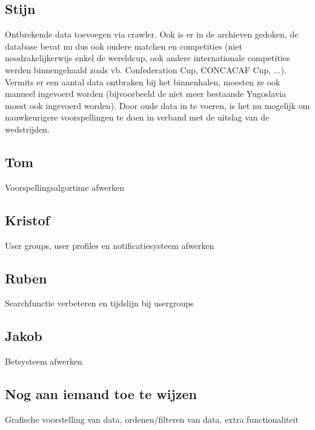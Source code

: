 \documentclass[11pt, a4paper]{article}
\begin{document}
\subsection{Stijn}
Ontbrekende data toevoegen via crawler. Ook is er in de archieven gedoken, de database bevat nu dus ook oudere matchen en competities (niet noodzakelijkerwijs enkel de wereldcup, ook andere internationale competities werden binnengehaald zoals vb. Confederation Cup, CONCACAF Cup, ...). Vermits er een aantal data ontbraken bij het binnenhalen, moesten ze ook manueel ingevoerd worden (bijvoorbeeld de niet meer bestaande Yugoslavia moest ook ingevoerd worden). Door oude data in te voeren, is het nu mogelijk om nauwkeurigere voorspellingen te doen in verband met de uitslag van de wedstrijden.
\subsection{Tom}
Voorspellingsalgortime afwerken
\subsection{Kristof}
User groups, user profiles en notificatiesysteem afwerken
\subsection{Ruben}
Searchfunctie verbeteren en tijdslijn bij usergroups
\subsection{Jakob}
Betsysteem afwerken
\subsection{Nog aan iemand toe te wijzen}
Grafische voorstelling van data, ordenen/filteren van data, extra functionaliteit
\end{document}
